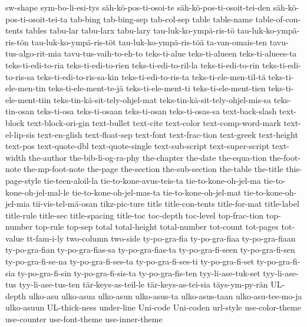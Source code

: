 {  sw-shape
  sym-bo-li-esi-tys
  säh-kö-pos-ti-osoi-te
  säh-kö-pos-ti-osoit-tei-den
  säh-kö-pos-ti-osoit-tei-ta
  tab-bing
  tab-bing-sep
  tab-col-sep
  table
  table-name
  table-of-con-tents
  tables
  tabu-lar
  tabu-larx
  tabu-lary
  tau-luk-ko-ympä-ris-tö
  tau-luk-ko-ympä-ris-tön
  tau-luk-ko-ympä-ris-töt
  tau-luk-ko-ympä-ris-töä
  ta-van-omais-ten
  tavu-tus-algo-rit-mia
  tavu-tus-vaih-to-eh-to
  teks-ti-alue
  teks-ti-alueen
  teks-ti-aluees-ta
  teks-ti-edi-to-ria
  teks-ti-edi-to-rien
  teks-ti-edi-to-ril-la
  teks-ti-edi-to-rin
  teks-ti-edi-to-ris-sa
  teks-ti-edi-to-ris-sa-kin
  teks-ti-edi-to-ris-ta
  teks-ti-ele-men-til-tä
  teks-ti-ele-men-tin
  teks-ti-ele-ment-te-jä
  teks-ti-ele-ment-ti
  teks-ti-ele-ment-tien
  teks-ti-ele-ment-tiin
  teks-tin-kä-sit-tely-ohjel-mat
  teks-tin-kä-sit-tely-ohjel-mis-sa
  teks-tin-osan
  teks-ti-osa
  teks-ti-osaan
  teks-ti-osan
  teks-ti-osas-sa
  text-back-slash
  text-block
  text-block-ori-gin
  text-bullet
  text-cite
  text-color
  text-comp-word-mark
  text-el-lip-sis
  text-en-glish
  text-float-sep
  text-font
  text-frac-tion
  text-greek
  text-height
  text-pos
  text-quote-dbl
  text-quote-single
  text-sub-script
  text-super-script
  text-width
  the-author
  the-bib-li-og-ra-phy
  the-chapter
  the-date
  the-equa-tion
  the-foot-note
  the-mp-foot-note
  the-page
  the-section
  the-sub-section
  the-table
  the-title
  this-page-style
  tie-teen-aloil-la
  tie-to-kone-avus-teis-ta
  tie-to-kone-oh-jel-ma
  tie-to-kone-oh-jel-mal-le
  tie-to-kone-oh-jel-mas-ta
  tie-to-kone-oh-jel-mat
  tie-to-kone-oh-jel-mia
  tii-vis-tel-mä-osan
  tikz-pic-ture
  title
  title-con-tents
  title-for-mat
  title-label
  title-rule
  title-sec
  title-spacing
  title-toc
  toc-depth
  toc-level
  top-frac-tion
  top-number
  top-rule
  top-sep
  total
  total-height
  total-number
  tot-count
  tot-pages
  tot-value
  tt-fam-i-ly
  two-column
  two-side
  ty-po-gra-fia
  ty-po-gra-fiaa
  ty-po-gra-fiaan
  ty-po-gra-fian
  ty-po-gra-fias-sa
  ty-po-gra-fias-ta
  ty-po-gra-fi-seen
  ty-po-gra-fi-sen
  ty-po-gra-fi-se-na
  ty-po-gra-fi-ses-ta
  ty-po-gra-fi-ses-ti
  ty-po-gra-fi-set
  ty-po-gra-fi-sia
  ty-po-gra-fi-sin
  ty-po-gra-fi-sis-ta
  ty-po-gra-fis-ten
  tyy-li-ase-tuk-set
  tyy-li-ase-tus
  tyy-li-ase-tus-ten
  tär-keys-as-teil-le
  tär-keys-as-tei-sia
  täys-ym-py-rän
  UL-depth
  ulko-asu
  ulko-asua
  ulko-asun
  ulko-asus-ta
  ulko-asus-taan
  ulko-asu-tee-mo-ja
  ulko-asuun
  UL-thick-ness
  under-line
  Uni-code
  Uni-coden
  url-style
  use-color-theme
  use-counter
  use-font-theme
  use-inner-theme
}
